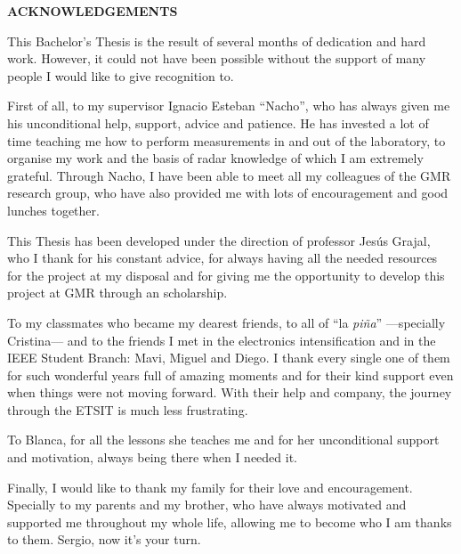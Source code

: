 \pagebreak[1]
\clearpage
\thispagestyle{plain}

\begin{center}
	\vspace*{1.5cm}
	{\Large \bfseries ACKNOWLEDGEMENTS}
	\vspace{1.5cm}
\end{center}

This Bachelor's Thesis is the result of several months of dedication and hard work. However, it could not have been possible without the support of many people I would like to give recognition to.

First of all, to my supervisor Ignacio Esteban ``Nacho'', who has always given me his unconditional help, support, advice and patience. He has invested a lot of time teaching me how to perform measurements in and out of the laboratory, to organise my work and the basis of radar knowledge of which I am extremely grateful. Through Nacho, I have been able to meet all my colleagues of the GMR research group, who have also provided me with lots of encouragement and good lunches together.

This Thesis has been developed under the direction of professor Jesús Grajal, who I thank for his constant advice, for always having all the needed resources for the project at my disposal and for giving me the opportunity to develop this project at GMR through an scholarship.

To my classmates who became my dearest friends, to all of ``la \textit{piña}'' ---specially Cristina--- and to the friends I met in the electronics intensification and in the IEEE Student Branch: Mavi, Miguel and Diego. I thank every single one of them for such wonderful years full of amazing moments and for their kind support even when things were not moving forward. With their help and company, the journey through the ETSIT is much less frustrating.

To Blanca, for all the lessons she teaches me and for her unconditional support and motivation, always being there when I needed it.

Finally, I would like to thank my family for their love and encouragement. Specially to my parents and my brother, who have always motivated and supported me throughout my whole life, allowing me to become who I am thanks to them. Sergio, now it's your turn.





